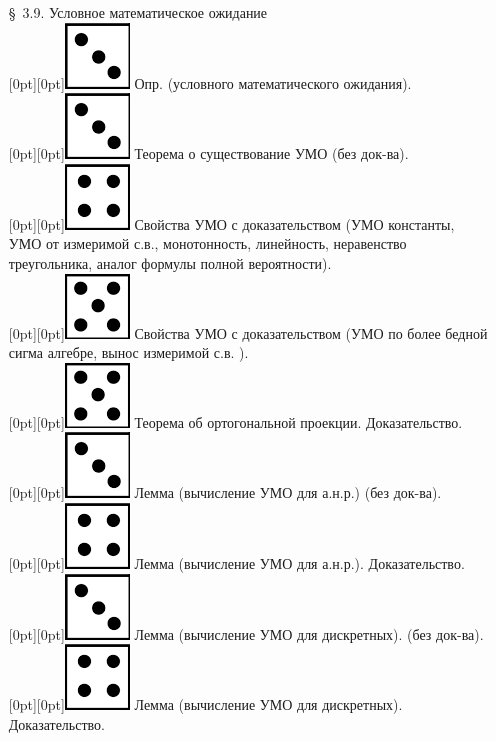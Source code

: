 \documentclass[10pt]{amsart}
\begin{document}
\begin{enumerate}
\begin{enumerate}
    
\item[\S\, 3.9.] Условное математическое ожидание \\
 \raisebox{-1pt}[0pt][0pt]{\includegraphics[width=0.02\linewidth]{3.png}} Опр. (условного математического ожидания). \\
 \raisebox{-1pt}[0pt][0pt]{\includegraphics[width=0.02\linewidth]{3.png}} Теорема о существование УМО (без док-ва). \\
 \raisebox{-1pt}[0pt][0pt]{\includegraphics[width=0.02\linewidth]{4.png}} Свойства УМО с доказательством (УМО константы, УМО от измеримой с.в., монотонность,  линейность, неравенство треугольника,  аналог формулы полной вероятности). \\
 \raisebox{-1pt}[0pt][0pt]{\includegraphics[width=0.02\linewidth]{5.png}} Свойства УМО с доказательством (УМО по более бедной сигма алгебре, вынос измеримой с.в. ). \\
 \raisebox{-1pt}[0pt][0pt]{\includegraphics[width=0.02\linewidth]{5.png}} Теорема об ортогональной проекции. Доказательство. \\
 \raisebox{-1pt}[0pt][0pt]{\includegraphics[width=0.02\linewidth]{3.png}} Лемма (вычисление УМО для а.н.р.)  (без док-ва). \\
 \raisebox{-1pt}[0pt][0pt]{\includegraphics[width=0.02\linewidth]{4.png}} Лемма (вычисление УМО для а.н.р.). Доказательство. \\
 \raisebox{-1pt}[0pt][0pt]{\includegraphics[width=0.02\linewidth]{3.png}} Лемма (вычисление УМО для дискретных). (без док-ва). \\
 \raisebox{-1pt}[0pt][0pt]{\includegraphics[width=0.02\linewidth]{4.png}} Лемма (вычисление УМО для дискретных). Доказательство. \\

\end{enumerate}
\end{enumerate}
\end{document}
